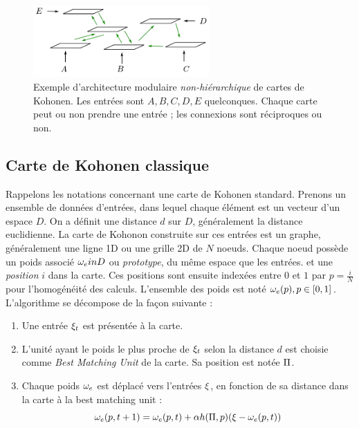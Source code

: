 \begin{figure}
\centering
\includegraphics[width=0.6\textwidth]{architecture.pdf}
\caption{Exemple d'architecture modulaire \emph{non-hiérarchique} de cartes de Kohonen. Les entrées sont $A,B,C,D,E$ quelconques. Chaque carte peut ou non prendre une entrée ; les connexions sont réciproques ou non.}
\label{fig:archi_non_hierarchique}
\end{figure}


\subsection{Carte de Kohonen classique}

Rappelons les notations concernant une carte de Kohonen standard. Prenons un ensemble de données d'entrées, dans lequel chaque élément est un vecteur d'un espace $D$. On a définit une distance $d$ sur $D$, généralement la distance euclidienne.
La carte de Kohonon construite sur ces entrées est un graphe, généralement une ligne 1D ou une grille 2D de $N$ noeuds. Chaque noeud possède un poids associé $\omega_e in D$ ou \emph{prototype}, du même espace que les entrées. et une \emph{position} $i$ dans la carte. Ces positions sont ensuite indexées entre $0$ et $1$ par $p= \frac{i}{N}$ pour l'homogénéité des calculs. 
L'ensemble des poids est noté ${\omega_e(p), p \in [0,1]}$. 
L'algorithme se décompose de la façon suivante :

\begin{enumerate}
\item Une entrée $\xi_t$ est présentée à la carte.
\item L'unité ayant le poids le plus proche de $\xi_t$ selon la distance $d$ est choisie comme \emph{Best Matching Unit} de la carte. Sa position est notée $\Pi$.
\item Chaque poids $\omega_e$ est déplacé vers l'entrées $\xi$, en fonction de sa distance dans la carte à la best matching unit : 
\begin{equation}
\omega_e(p,t+1) = \omega_e(p,t) + \alpha h(\Pi,p)(\xi - \omega_e(p,t))
\label{eq:update}
\end{equation}

\end{enumerate}

